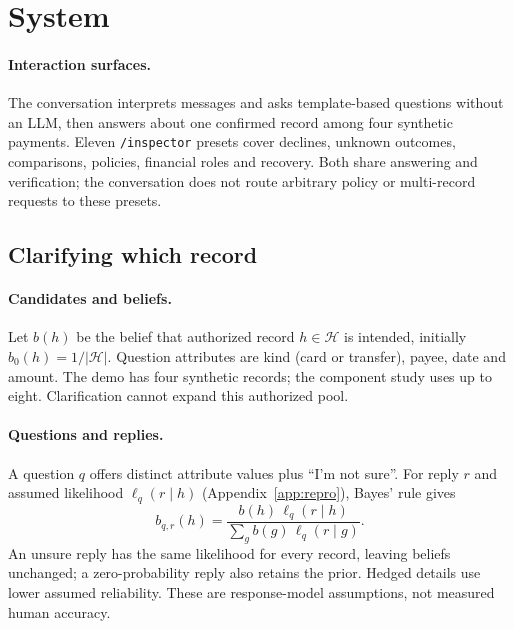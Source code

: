 \documentclass[11pt]{article}
\begin{document}
\section{System}
\label{sec:system}

\paragraph{Interaction surfaces.} The conversation interprets messages and asks template-based
questions without an LLM, then answers about one confirmed record among four synthetic payments.
Eleven \texttt{/inspector} presets cover declines, unknown outcomes, comparisons, policies, financial roles and recovery.
Both share answering and verification; the conversation does not route arbitrary policy or
multi-record requests to these presets.

\subsection{Clarifying which record}

\paragraph{Candidates and beliefs.}
Let $b(h)$ be the belief that authorized record $h\in\mathcal{H}$ is intended, initially
$b_0(h)=1/|\mathcal{H}|$. Question attributes are kind (card or transfer), payee, date and amount.
The demo has four synthetic records; the component study uses up to eight. Clarification cannot
expand this authorized pool.

\paragraph{Questions and replies.}
A question $q$ offers distinct attribute values plus ``I'm not sure''. For reply $r$ and assumed
likelihood $\ell_q(r\mid h)$ (Appendix~\ref{app:repro}), Bayes' rule gives
\begin{equation}
b_{q,r}(h)=\frac{b(h)\,\ell_q(r\mid h)}{\sum_g b(g)\,\ell_q(r\mid g)}.
\label{eq:bayes}
\end{equation}
An unsure reply has the same likelihood for every record, leaving beliefs unchanged; a
zero-probability reply also retains the prior. Hedged details use lower assumed reliability.
These are response-model assumptions, not measured human accuracy.
\end{document}
